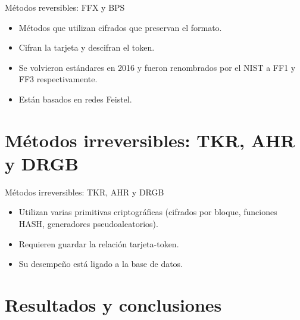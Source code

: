 \documentclass{beamer}
\begin{document}
  \begin{frame}{Métodos reversibles: FFX y BPS}

    \begin{itemize}
      \item Métodos que utilizan cifrados que preservan el formato.
      \item Cifran la tarjeta y descifran el token.
      \item Se volvieron estándares en 2016 y fueron renombrados por el NIST
        a FF1 y FF3 respectivamente.
      \item Están basados en redes Feistel.
    \end{itemize}

  \end{frame}

  \section{Métodos irreversibles: TKR, AHR y DRGB}

  \begin{frame}{Métodos irreversibles: TKR, AHR y DRGB}
    \begin{itemize}
      \item Utilizan varias primitivas criptográficas (cifrados por bloque,
        funciones HASH, generadores pseudoaleatorios).
      \item Requieren guardar la relación tarjeta-token.
      \item Su desempeño está ligado a la base de datos.
    \end{itemize}

  \end{frame}

  \section{Resultados y conclusiones}
\end{document}
